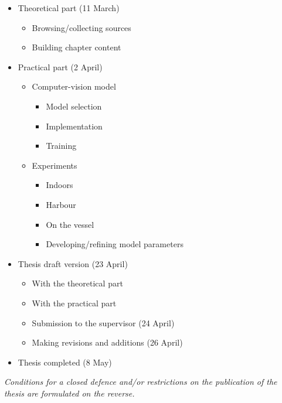 \begin{itemize}
  \item Theoretical part (11 March)
    \begin{itemize}
      \item Browsing/collecting sources
      \item Building chapter content
    \end{itemize}
  \item Practical part (2 April)
    \begin{itemize}
      \item Computer-vision model
        \begin{itemize}
          \item Model selection
          \item Implementation
          \item Training
        \end{itemize}
      \item Experiments
        \begin{itemize}
          \item Indoors
          \item Harbour
          \item On the vessel
          \item Developing/refining model parameters
        \end{itemize}
    \end{itemize}
  \item Thesis draft version (23 April)
    \begin{itemize}
      \item With the theoretical part
      \item With the practical part
      \item Submission to the supervisor (24 April)
      \item Making revisions and additions (26 April)
    \end{itemize}
  \item Thesis completed (8 May)
\end{itemize}

\textit{Conditions for a closed defence and/or restrictions on the publication of the thesis are formulated on the reverse.}
